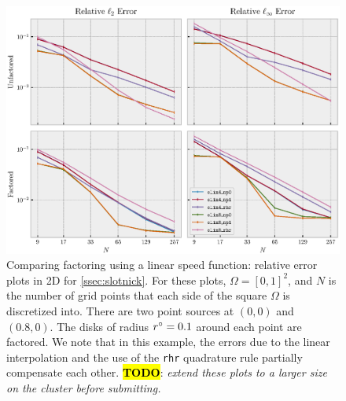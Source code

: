 \documentclass[sisc-eikonal.tex]{subfiles}
\begin{document}
\begin{figure}[t]
  \centering
  \includegraphics[width=\linewidth]{qv_plots_2d.eps}
  \caption{Comparing factoring using a linear speed function: relative
    error plots in 2D for \cref{ssec:slotnick}. For these plots,
    $\Omega = [0, 1]^2$, and $N$ is the number of grid points that
    each side of the square $\Omega$ is discretized into. There are
    two point sources at $(0, 0)$ and $(0.8, 0)$. The disks of radius
    $r^\circ = 0.1$ around each point are factored. We note that in this
    example, the errors due to the linear interpolation and the use of
    the \texttt{rhr} quadrature rule partially compensate each
    other. \hl{\textbf{TODO}}: \emph{extend these plots to a larger
      size on the cluster before submitting.}}\label{fig:qv-2d}
\end{figure}
\end{document}
